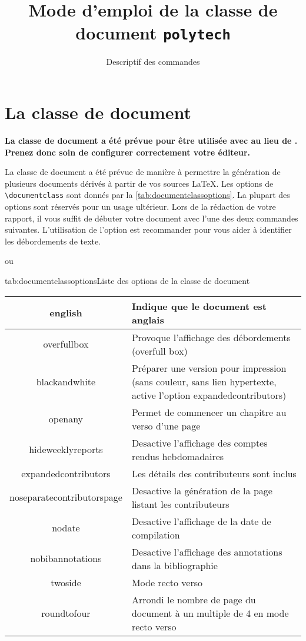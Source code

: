 \documentclass[overfullbox,hideweeklyreports,noseparatecontributorspage,nodate]{polytech/polytech}
\title{Mode d'emploi de la classe de document \texttt{polytech}}
\subtitle{Descriptif des commandes}
\begin{document}
\maketitle

\chapter{La classe de document}

\begin{center}
\textbf{La classe de document a été prévue pour être utilisée avec  au lieu de . Prenez donc soin de configurer correctement votre éditeur.}
\end{center}

La classe de document a été prévue de manière à permettre la génération de plusieurs documents dérivés à partir de vos sources LaTeX. Les options de \texttt{\textbackslash{}documentclass} sont donnés par la \autoref{tab:documentclassoptions}. La plupart des options sont réservés pour un usage ultérieur. Lors de la rédaction de votre rapport, il vous suffit de débuter votre document avec l'une des deux commandes suivantes. L'utilisation de l'option  est recommander pour vous aider à identifier les débordements de texte.
ou

\begin{Table}{tab:documentclassoptions}{Liste des options de la classe de document}
\begin{tabu}{|c|X[m]|}
\hline
english&Indique que le document est anglais\\\hline
overfullbox&Provoque l'affichage des débordements (overfull box)\\\hline
blackandwhite&Préparer une version pour impression (sans couleur, sans lien hypertexte, active l'option expandedcontributors)\\\hline
openany&Permet de commencer un chapitre au verso d'une page\\\hline
hideweeklyreports&Desactive l'affichage des comptes rendus hebdomadaires\\\hline
expandedcontributors&Les détails des contributeurs sont inclus\\\hline
noseparatecontributorspage&Desactive la génération de la page listant les contributeurs\\\hline
nodate&Desactive l'affichage de la date de compilation\\\hline
nobibannotations&Desactive l'affichage des annotations dans la bibliographie\\\hline
twoside&Mode recto verso\\\hline
roundtofour&Arrondi le nombre de page du document à un multiple de 4 en mode recto verso\\\hline
\end{tabu}
\end{Table}
\end{document}
